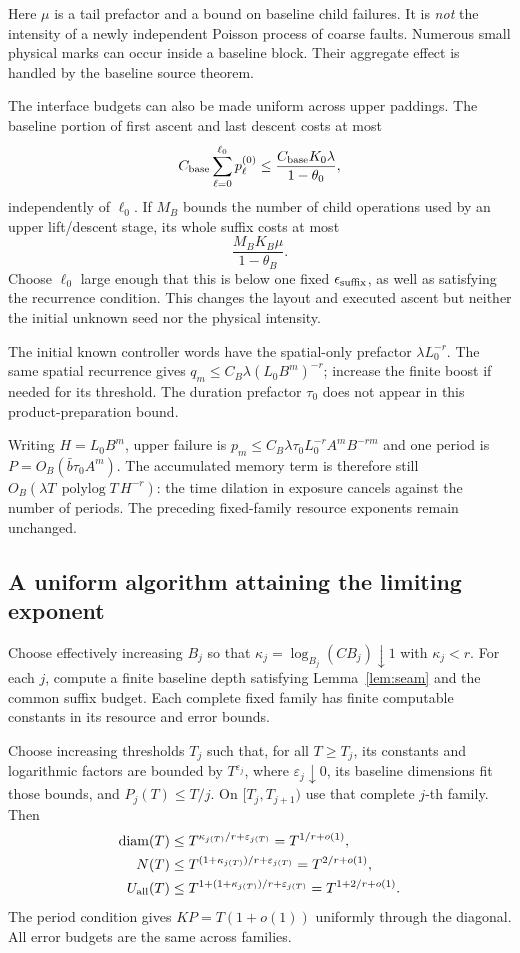 \documentclass[11pt]{article}
\newcommand{\diam}{\operatorname{diam}}
\begin{document}
Here $\mu$ is a tail prefactor and a bound on baseline child failures.
It is \emph{not} the intensity of a newly independent Poisson process of
coarse faults. Numerous small physical marks can occur inside a baseline
block. Their aggregate effect is handled by the baseline source theorem.

The interface budgets can also be made uniform across upper paddings.
The baseline portion of first ascent and last descent costs at most
\[
 C_{\rm base}\sum_{\ell=0}^{\ell_0}p^{(0)}_\ell
 \leq \frac{C_{\rm base}K_0\lambda}{1-\theta_0},
\]
independently of $\ell_0$. If $M_B$ bounds the number of child operations
used by an upper lift/descent stage, its whole suffix costs at most
\[
 \frac{M_BK_B\mu}{1-\theta_B}.
\]
Choose $\ell_0$ large enough that this is below one fixed
$\epsilon_{\rm suffix}$, as well as satisfying the recurrence condition.
This changes the layout and executed ascent but neither the initial
unknown seed nor the physical intensity.

The initial known controller words have the spatial-only prefactor
$\lambda L_0^{-r}$. The same spatial recurrence gives
$q_m\leq C_B\lambda(L_0B^m)^{-r}$; increase the finite boost if needed
for its threshold. The duration prefactor $\tau_0$ does not appear in
this product-preparation bound.

Writing $H=L_0B^m$, upper failure is
$p_m\leq C_B\lambda\tau_0L_0^{-r}A^mB^{-rm}$ and one period is
$P=O_B(\bar b\tau_0A^m)$. The accumulated memory term is therefore
still $O_B(\lambda T\,\operatorname{polylog}T\,H^{-r})$:
the time dilation in exposure cancels against the number of periods.
The preceding fixed-family resource exponents remain unchanged.

\subsection{A uniform algorithm attaining the limiting exponent}

Choose effectively increasing $B_j$ so that
$\kappa_j=\log_{B_j}(CB_j)\downarrow1$ with $\kappa_j<r$.
For each $j$, compute a finite baseline depth satisfying
Lemma~\ref{lem:seam} and the common suffix budget. Each complete fixed
family has finite computable constants in its resource and error bounds.

Choose increasing thresholds $T_j$ such that, for all $T\geq T_j$,
its constants and logarithmic factors are bounded by $T^{\varepsilon_j}$,
where $\varepsilon_j\downarrow0$, its baseline dimensions fit those
bounds, and $P_j(T)\leq T/j$. On $[T_j,T_{j+1})$ use that complete
$j$-th family. Then
\begin{align}
 \diam(T)&\leq T^{\kappa_{j(T)}/r+\varepsilon_{j(T)}}
                    =T^{1/r+o(1)},\\
 N(T)&\leq T^{(1+\kappa_{j(T)})/r+\varepsilon_{j(T)}}
                    =T^{2/r+o(1)},\\
 U_{\rm all}(T)&\leq T^{1+(1+\kappa_{j(T)})/r+\varepsilon_{j(T)}}
                    =T^{1+2/r+o(1)}.
\end{align}
The period condition gives $KP=T(1+o(1))$ uniformly through the
diagonal. All error budgets are the same across families.
\end{document}
